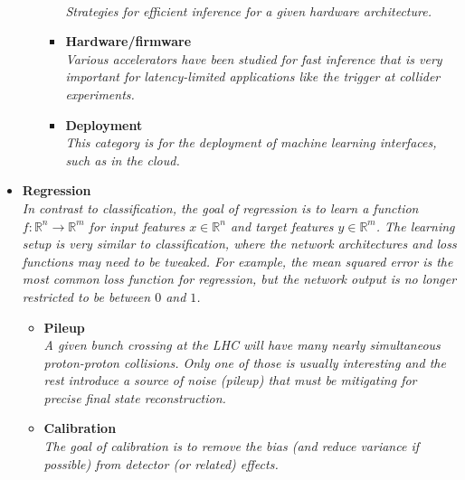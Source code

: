\documentclass[12pt,letterpaper]{article}
\begin{document}
\begin{itemize}
\begin{itemize}
\begin{itemize}
				\\\textit{Strategies for efficient inference for a given hardware architecture.}
				\item \textbf{Hardware/firmware}~\cite{Duarte:2018ite,DiGuglielmo:2020eqx,Summers:2020xiy,1808088,Iiyama:2020wap,Mohan:2020vvi,Carrazza:2020qwu,Rankin:2020usv,Heintz:2020soy,Rossi:2020sbh,Aarrestad:2021zos,Hawks:2021ruw,Teixeira:2021yhl,Hong:2021snb,DiGuglielmo:2021ide,Migliorini:2021fuj,Govorkova:2021utb}
				\\\textit{Various accelerators have been studied for fast inference that is very important for latency-limited applications like the trigger at collider experiments.}
				\item \textbf{Deployment}~\cite{Kuznetsov:2020mcj,SunnebornGudnadottir:2021nhk}
				\\\textit{This category is for the deployment of machine learning interfaces, such as in the cloud.}
			\end{itemize}
	\end{itemize}
\item \textbf{Regression}
\\\textit{In contrast to classification, the goal of regression is to learn a function $f:\mathbb{R}^n\rightarrow\mathbb{R}^m$ for input features $x\in\mathbb{R}^n$ and target features $y\in\mathbb{R}^m$.  The learning setup is very similar to classification, where the network architectures and loss functions may need to be tweaked.  For example, the mean squared error is the most common loss function for regression, but the network output is no longer restricted to be between $0$ and $1$.}
	\begin{itemize}
		\item \textbf{Pileup}~\cite{Komiske:2017ubm,ATL-PHYS-PUB-2019-028,Martinez:2018fwc,Carrazza:2019efs,Maier:2021ymx}
		\\\textit{A given bunch crossing at the LHC will have many nearly simultaneous proton-proton collisions.  Only one of those is usually interesting and the rest introduce a source of noise (pileup) that must be mitigating for precise final state reconstruction.}
		\item \textbf{Calibration}~\cite{Cheong:2019upg,ATL-PHYS-PUB-2020-001,ATL-PHYS-PUB-2018-013,Hooberman:DLPS2017,Kasieczka:2020vlh,Sirunyan:2019wwa,Baldi:2020hjm,Du:2020pmp,Kieseler:2021jxc,Pollard:2021fqv,Akchurin:2021afn,Kieseler:2020wcq,Akchurin:2021ahx,Diefenthaler:2021rdj,Polson:2021kvr,Micallef:2021src,Arratia:2021tsq}
		\\\textit{The goal of calibration is to remove the bias (and reduce variance if possible) from detector (or related) effects.}

\end{itemize}
\end{itemize}
\end{document}
